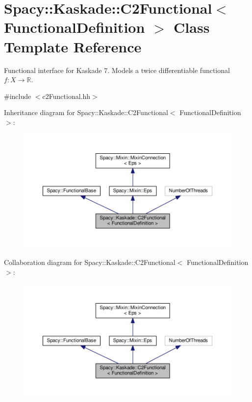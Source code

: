 \hypertarget{classSpacy_1_1Kaskade_1_1C2Functional}{\section{Spacy\-:\-:Kaskade\-:\-:C2\-Functional$<$ Functional\-Definition $>$ Class Template Reference}
\label{classSpacy_1_1Kaskade_1_1C2Functional}
}


Functional interface for Kaskade 7. Models a twice differentiable functional $f:X\rightarrow \mathbb{R}$.  




{\ttfamily \#include $<$c2\-Functional.\-hh$>$}



Inheritance diagram for Spacy\-:\-:Kaskade\-:\-:C2\-Functional$<$ Functional\-Definition $>$\-:
\nopagebreak
\begin{figure}[H]
\begin{center}
\leavevmode
\includegraphics[width=350pt]{classSpacy_1_1Kaskade_1_1C2Functional__inherit__graph}
\end{center}
\end{figure}


Collaboration diagram for Spacy\-:\-:Kaskade\-:\-:C2\-Functional$<$ Functional\-Definition $>$\-:
\nopagebreak
\begin{figure}[H]
\begin{center}
\leavevmode
\includegraphics[width=350pt]{classSpacy_1_1Kaskade_1_1C2Functional__coll__graph}
\end{center}
\end{figure}
